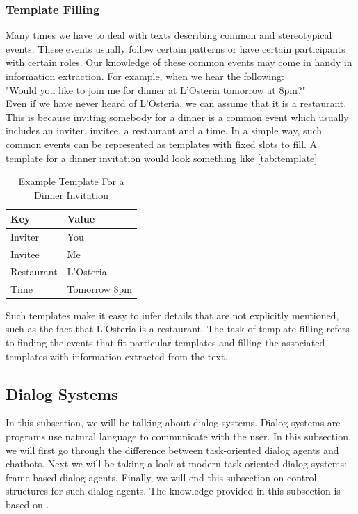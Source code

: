 \subsubsection{Template Filling}
Many times we have to deal with texts describing common and stereotypical events.
These events usually follow certain patterns or have certain participants with certain roles.
Our knowledge of these common events may come in handy in information extraction.
For example, when we hear the following:\\
"Would you like to join me for dinner at L'Osteria tomorrow at 8pm?"\\
Even if we have never heard of L'Osteria, we can assume that it is a restaurant.
This is because inviting somebody for a dinner is a common event which usually includes an inviter, invitee, a restaurant and a time.
In a simple way, such common events can be represented as templates with fixed slots to fill.
A template for a dinner invitation would look something like \autoref{tab:template}

\begin{table}[htbp]
  \caption[Example Template For a Dinner Invitation]{Example Template For a Dinner Invitation}\label{tab:template}
  \centering
  \begin{tabular}{l|l}
    Key&Value\\ \toprule
    Inviter&You\\ \hline
    Invitee&Me\\ \hline
    Restaurant&L'Osteria\\ \hline
    Time&Tomorrow 8pm\\ \hline
  \end{tabular}
\end{table}

Such templates make it easy to infer details that are not explicitly mentioned, such as the fact that L'Osteria is a restaurant.
The task of template filling refers to finding the events that fit particular templates 
and filling the associated templates with information extracted from the text.\

\subsection{Dialog Systems}
In this subsection, we will be talking about dialog systems.
Dialog systems are programs use natural language to communicate with the user.
In this subsection, we will first go through the difference between task-oriented dialog agents and chatbots.
Next we will be taking a look at modern task-oriented dialog systems: frame based dialog agents.
Finally, we will end this subsection on control structures for such dialog agents.
The knowledge provided in this subsection is based on \parencite{nlp_chatbots}.

